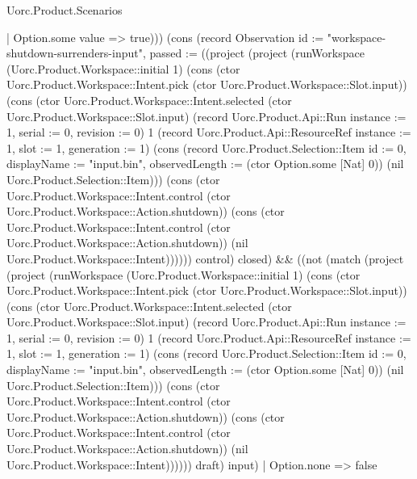 \begin{lexlean}{Uorc.Product.Scenarios}
\begin{semanticmodule}
{{    | Option.some value => true))}) (cons (record Observation {id := "workspace-shutdown-surrenders-input", passed := ((project (project (runWorkspace (Uorc.Product.Workspace::initial 1) (cons (ctor Uorc.Product.Workspace::Intent.pick (ctor Uorc.Product.Workspace::Slot.input)) (cons (ctor Uorc.Product.Workspace::Intent.selected (ctor Uorc.Product.Workspace::Slot.input) (record Uorc.Product.Api::Run {instance := 1, serial := 0, revision := 0}) 1 (record Uorc.Product.Api::ResourceRef {instance := 1, slot := 1, generation := 1}) (cons (record Uorc.Product.Selection::Item {id := 0, displayName := "input.bin", observedLength := (ctor Option.some [Nat] 0)}) (nil Uorc.Product.Selection::Item))) (cons (ctor Uorc.Product.Workspace::Intent.control (ctor Uorc.Product.Workspace::Action.shutdown)) (cons (ctor Uorc.Product.Workspace::Intent.control (ctor Uorc.Product.Workspace::Action.shutdown)) (nil Uorc.Product.Workspace::Intent)))))) control) closed) && ((not (match (project (project (runWorkspace (Uorc.Product.Workspace::initial 1) (cons (ctor Uorc.Product.Workspace::Intent.pick (ctor Uorc.Product.Workspace::Slot.input)) (cons (ctor Uorc.Product.Workspace::Intent.selected (ctor Uorc.Product.Workspace::Slot.input) (record Uorc.Product.Api::Run {instance := 1, serial := 0, revision := 0}) 1 (record Uorc.Product.Api::ResourceRef {instance := 1, slot := 1, generation := 1}) (cons (record Uorc.Product.Selection::Item {id := 0, displayName := "input.bin", observedLength := (ctor Option.some [Nat] 0)}) (nil Uorc.Product.Selection::Item))) (cons (ctor Uorc.Product.Workspace::Intent.control (ctor Uorc.Product.Workspace::Action.shutdown)) (cons (ctor Uorc.Product.Workspace::Intent.control (ctor Uorc.Product.Workspace::Action.shutdown)) (nil Uorc.Product.Workspace::Intent)))))) draft) input)
    | Option.none => false
}}
\end{semanticmodule}
\end{lexlean}
